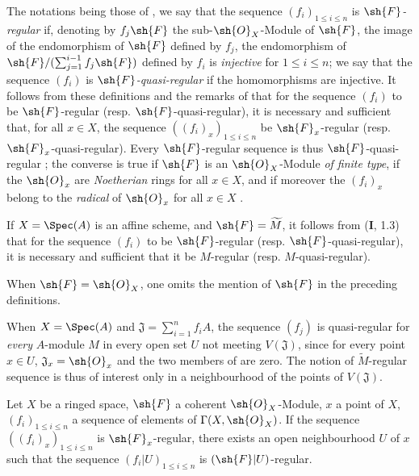 \begin{env}[15.2.2]
\label{0.15.2.2}
The notations being those of , we say that the sequence $(f_i)_{1\leq i\leq n}$ is \emph{$\sh{F}$-regular} if, denoting by $f_j\sh{F}$ the sub-$\sh{O}_X$-Module of $\sh{F}$, the image of the endomorphism of $\sh{F}$ defined by $f_j$, the endomorphism of $\sh{F}/(\sum_{j=1}^{i-1}f_j\sh{F})$ defined by $f_i$ is \emph{injective} for $1\leq i\leq n$;
we say that the sequence $(f_i)$ is \emph{$\sh{F}$-quasi-regular} if the homomorphisms  are injective.
It follows from these definitions and the remarks of  that for the sequence $(f_i)$ to be $\sh{F}$-regular (resp. $\sh{F}$-quasi-regular), it is necessary and sufficient that, for all $x\in X$, the sequence $((f_i)_x)_{1\leq i\leq n}$ be $\sh{F}_x$-regular (resp. $\sh{F}_x$-quasi-regular).
Every $\sh{F}$-regular sequence is thus $\sh{F}$-quasi-regular ;
the converse is true if $\sh{F}$ is an $\sh{O}_X$-Module \emph{of finite type}, if the $\sh{O}_x$ are \emph{Noetherian} rings for all $x\in X$, and if moreover the $(f_i)_x$ belong to the \emph{radical} of $\sh{O}_x$ for all $x\in X$ .

If $X=\Spec(A)$ is an affine scheme, and $\sh{F}=\widetilde{M}$, it follows from ($\mathbf{I}$, 1.3) that for the sequence $(f_i)$ to be $\sh{F}$-regular (resp. $\sh{F}$-quasi-regular), it is necessary and sufficient that it be $M$-regular (resp. $M$-quasi-regular).

When $\sh{F}=\sh{O}_X$, one omits the mention of $\sh{F}$ in the preceding definitions.
\end{env}

\begin{remark}[15.2.3]
\label{0.15.2.3}
When $X=\Spec(A)$ and $\mathfrak{J}=\sum_{i=1}^n f_iA$, the sequence $(f_j)$ is quasi-regular for \emph{every} $A$-module $M$ in every open set $U$ not meeting $V(\mathfrak{J})$, since for every point $x\in U$, $\mathfrak{J}_x=\sh{O}_x$ and the two members of  are zero.
The notion of $\widetilde{M}$-regular sequence is thus of interest only in a neighbourhood of the points of $V(\mathfrak{J})$.
\end{remark}

\begin{proposition}[15.2.4]
\label{0.15.2.4}
Let $X$ be a ringed space, $\sh{F}$ a coherent $\sh{O}_X$-Module, $x$ a point of $X$, $(f_i)_{1\leq i\leq n}$ a sequence of elements of $\Gamma(X,\sh{O}_X)$.
If the sequence $((f_i)_x)_{1\leq i\leq n}$ is $\sh{F}_x$-regular, there exists an open neighbourhood $U$ of $x$ such that the sequence $(f_i|U)_{1\leq i\leq n}$ is $(\sh{F}|U)$-regular.
\end{proposition}

